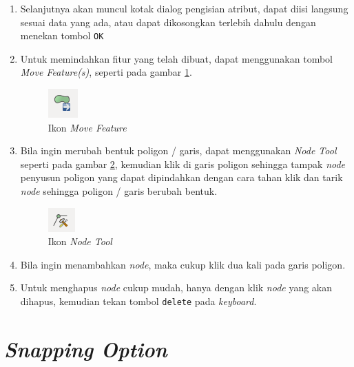 \begin{enumerate}[1.]
  \item Selanjutnya akan muncul kotak dialog pengisian atribut, dapat diisi langsung sesuai data yang ada, atau dapat dikosongkan terlebih dahulu dengan menekan tombol \texttt{OK}
  
  \item Untuk memindahkan fitur yang telah dibuat, dapat menggunakan tombol \textit{Move Feature(s)}, seperti pada gambar \ref{fig:movefeatureicon}.
  
  \begin{figure}[H]
    \centering
    \includegraphics[scale=1]{./resources/050-move-feature-icon}
    \caption{Ikon \textit{Move Feature}}
    \label{fig:movefeatureicon}
  \end{figure}
  
  \item Bila ingin merubah bentuk poligon / garis, dapat menggunakan \textit{Node Tool} seperti pada gambar \ref{fig:nodetoolicon}, kemudian klik di garis poligon sehingga tampak \textit{node} penyusun poligon yang dapat dipindahkan dengan cara tahan klik dan tarik \textit{node} sehingga poligon / garis berubah bentuk.
  
  \begin{figure}[H]
    \centering
    \includegraphics[scale=1]{./resources/051-node-tool-icon}
    \caption{Ikon \textit{Node Tool}}
    \label{fig:nodetoolicon}
  \end{figure}
  
  \item Bila ingin menambahkan \textit{node}, maka cukup klik dua kali pada garis poligon.
  
  \item Untuk menghapus \textit{node} cukup mudah, hanya dengan klik \textit{node} yang akan dihapus, kemudian tekan tombol \texttt{delete} pada \textit{keyboard}.

\end{enumerate}

\section{\textit{Snapping Option}}

